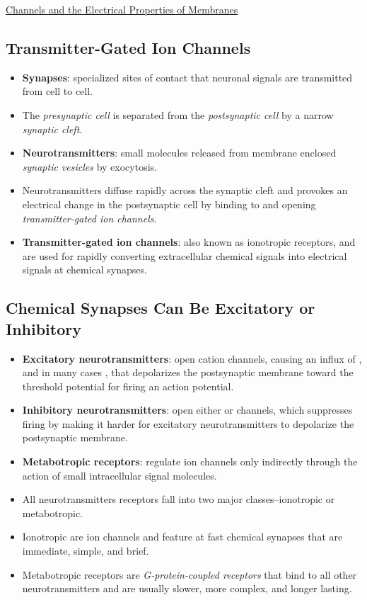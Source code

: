 \documentclass[12pt,letterpaper]{article}
\begin{document}
\begin{secbox}{\hyperlink{11}{Channels and the Electrical Properties of Membranes}}
{    \hypertarget{11.3.12}{\subsection*{Transmitter-Gated Ion Channels}}
    \begin{itemize}
        \item \textbf{Synapses}: specialized sites of contact that neuronal signals are transmitted from cell to cell.
        \item The \textit{presynaptic cell} is separated from the \textit{postsynaptic cell} by a narrow \textit{synaptic cleft}. 
        \item \textbf{Neurotransmitters}: small molecules released from membrane enclosed \textit{synaptic vesicles} by exocytosis. 
        \item Neurotransmitters diffuse rapidly across the synaptic cleft and provokes an electrical change in the postsynaptic cell by binding to and opening \textit{transmitter-gated ion channels}.
        \item \textbf{Transmitter-gated ion channels}: also known as ionotropic receptors, and are used for rapidly converting extracellular chemical signals into electrical signals at chemical synapses.
    \end{itemize}
    
    \hypertarget{11.3.13}{\subsection*{Chemical Synapses Can Be Excitatory or Inhibitory}}
    \begin{itemize}
        \item \textbf{Excitatory neurotransmitters}: open cation channels, causing an influx of , and in  many cases , that depolarizes the postsynaptic membrane toward the threshold potential for firing an action potential. 
        \item \textbf{Inhibitory neurotransmitters}: open either  or  channels, which suppresses firing by making it harder for excitatory neurotransmitters to depolarize the postsynaptic membrane. 
        \item \textbf{Metabotropic receptors}: regulate ion channels only indirectly through the action of small intracellular signal molecules. 
        \item All neurotransmitters receptors fall into two major classes--ionotropic or metabotropic.
        \item Ionotropic are ion channels and feature at fast chemical synapses that are immediate, simple, and brief.
        \item Metabotropic receptors are \textit{G-protein-coupled receptors} that bind to all other neurotransmitters and are usually slower, more complex, and longer lasting.
    \end{itemize}
    
}
\end{secbox}
\end{document}

